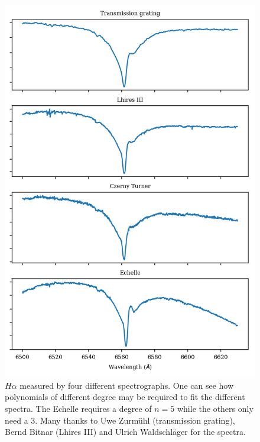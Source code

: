 \documentclass[10pt,a4paper,notitlepage,twocolumn]{article}
\begin{document}
\begin{figure}[ht]
	\includegraphics[width=\columnwidth]{img/four_spectra_big_4x1.png}
	\caption{$H\alpha$ measured by four different spectrographs. One can see how polynomials of different degree may be required to fit the different spectra. The Echelle requires a degree of $n=5$ while the others only need a $3$. Many thanks to Uwe Zurmühl (transmission grating), Bernd Bitnar (Lhires III) and Ulrich Waldschläger for the spectra.}
	\label{four_spectra}
\end{figure}
\end{document}
